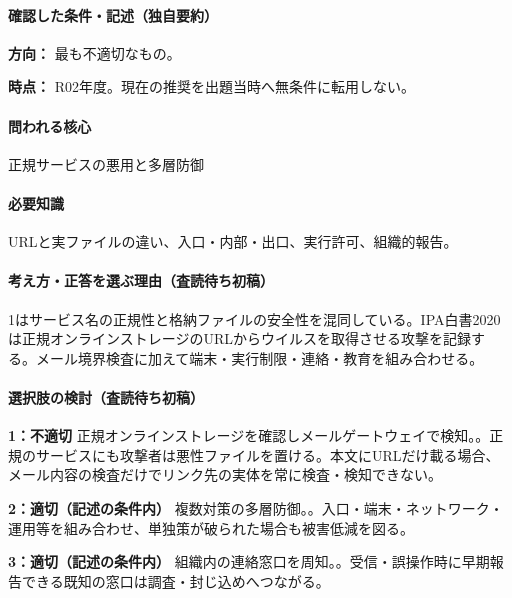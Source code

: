 \paragraph{確認した条件・記述（独自要約）}\mbox{}\par

\noindent\textbf{方向：} 最も不適切なもの。\par

\noindent\textbf{時点：} R02年度。現在の推奨を出題当時へ無条件に転用しない。\par

\paragraph{問われる核心} 正規サービスの悪用と多層防御

\paragraph{必要知識} URLと実ファイルの違い、入口・内部・出口、実行許可、組織的報告。

\paragraph{考え方・正答を選ぶ理由（査読待ち初稿）} 1はサービス名の正規性と格納ファイルの安全性を混同している。IPA白書2020は正規オンラインストレージのURLからウイルスを取得させる攻撃を記録する。メール境界検査に加えて端末・実行制限・連絡・教育を組み合わせる。

\paragraph{選択肢の検討（査読待ち初稿）}\mbox{}\par

\noindent\textbf{1：不適切} 正規オンラインストレージを確認しメールゲートウェイで検知。。正規のサービスにも攻撃者は悪性ファイルを置ける。本文にURLだけ載る場合、メール内容の検査だけでリンク先の実体を常に検査・検知できない。\par

\noindent\textbf{2：適切（記述の条件内）} 複数対策の多層防御。。入口・端末・ネットワーク・運用等を組み合わせ、単独策が破られた場合も被害低減を図る。\par

\noindent\textbf{3：適切（記述の条件内）} 組織内の連絡窓口を周知。。受信・誤操作時に早期報告できる既知の窓口は調査・封じ込めへつながる。\par

